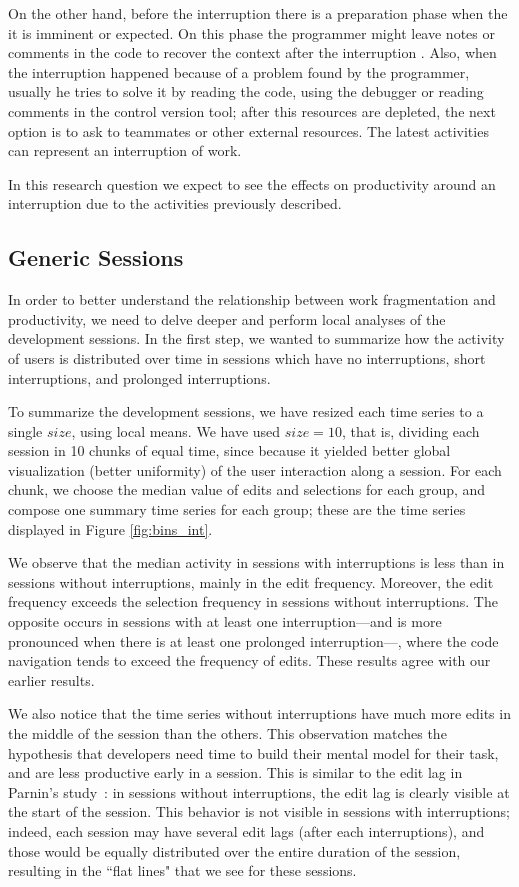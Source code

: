 \documentclass[times]{smrauth}
\begin{document}
On the other hand, before the interruption there is a preparation phase when the it is imminent or expected. On this phase the programmer might leave notes or comments in the code to recover the context after the interruption \cite{PD10}. Also, when the interruption happened because of a problem found by the programmer, usually he tries to solve it by reading the code, using the debugger or reading comments in the control version tool; after this resources are depleted, the next option is to ask to teammates or other external resources. The latest activities can represent an interruption of work.

In this research question we expect to see the effects on productivity around an interruption due to the activities previously described.


\subsection{Generic Sessions}

In order to better understand the relationship between work fragmentation and productivity, we need to delve deeper and perform local analyses of the development sessions. In the first step, we wanted to summarize how the activity of users is distributed over time in sessions which have no interruptions, short interruptions, and prolonged interruptions. 

To summarize the development sessions, we have resized each time series to a single $size$, using local means. We have used $size = 10$, that is, dividing each session in 10 chunks of equal time, since because it yielded better global visualization (better uniformity) of the user interaction along a session. For each chunk, we choose the median value of edits and selections for each group, and compose one summary time series for each group; these are the time series displayed in Figure \ref{fig:bins_int}.

We observe that the median activity in sessions with interruptions is less than in sessions without interruptions, mainly in the edit frequency. Moreover, the edit frequency exceeds the selection frequency in sessions without interruptions. The opposite occurs in sessions with at least one interruption---and is more pronounced when there is at least one prolonged interruption---, where the code navigation tends to exceed the frequency of edits. These results agree with our earlier results. 

We also notice that the time series without interruptions have much more edits in the middle of the session than the others. This observation matches the hypothesis that developers need time to build their mental model for their task, and are less productive early in a session. This is similar to the edit lag in Parnin's study~\cite{PR11}: in sessions without interruptions, the edit lag is clearly visible at the start of the session. This behavior is not visible in sessions with interruptions; indeed, each session may have several edit lags (after each interruptions), and those would be equally distributed over the entire duration of the session, resulting in the ``flat lines" that we see for these sessions.
\end{document}
